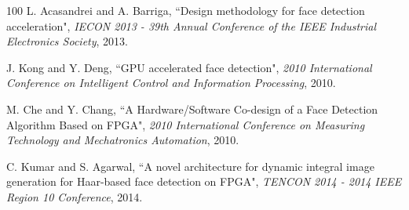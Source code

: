 \documentclass[conference]{IEEEtran}
\begin{document}
\begin {thebibliography}{100}
L. Acasandrei and A. Barriga, ``Design methodology for face detection acceleration", \emph{IECON 2013 - 39th Annual Conference of the IEEE Industrial Electronics Society}, 2013.

J. Kong and Y. Deng, ``GPU accelerated face detection", \emph{2010 International Conference on Intelligent Control and Information Processing}, 2010.

M. Che and Y. Chang, ``A Hardware/Software Co-design of a Face Detection Algorithm Based on FPGA", \emph{2010 International Conference on Measuring Technology and Mechatronics Automation}, 2010.

C. Kumar and S. Agarwal, ``A novel architecture for dynamic integral image generation for Haar-based face detection on FPGA", \emph{TENCON 2014 - 2014 IEEE Region 10 Conference}, 2014.

\end {thebibliography}

\end{document}
